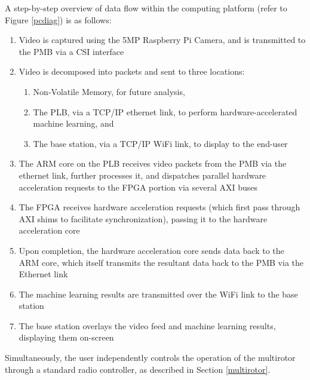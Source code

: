 A step-by-step overview of data flow within the computing platform (refer to Figure \ref{pcdiag}) is as follows:
\begin{enumerate}
\item Video is captured using the 5MP Raspberry Pi Camera, and is transmitted to the PMB via a CSI interface
\item Video is decomposed into packets and sent to three locations:
\begin{enumerate}
\item Non-Volatile Memory, for future analysis, 
\item The PLB, via a TCP/IP ethernet link, to perform hardware-accelerated machine learning, and
\item The base station, via a TCP/IP WiFi link, to display to the end-user
\end{enumerate}
\item The ARM core on the PLB receives video packets from the PMB via the ethernet link, further processes it, and dispatches parallel hardware acceleration requests to the FPGA portion via several AXI buses
\item The FPGA receives hardware acceleration requests (which first pass through AXI shims to facilitate synchronization), passing it to the hardware acceleration core
\item Upon completion, the hardware acceleration core sends data back to the ARM core, which itself transmits the resultant data back to the PMB via the Ethernet link
\item The machine learning results are transmitted over the WiFi link to the base station
\item The base station overlays the video feed and machine learning results, displaying them on-screen
\end{enumerate}

Simultaneously, the user independently controls the operation of the multirotor through a standard radio controller, as described in Section \ref{multirotor}.